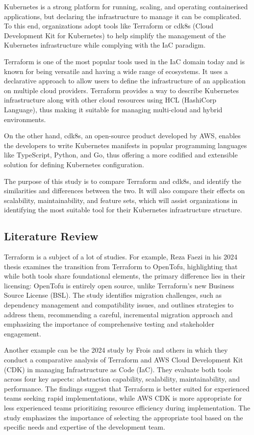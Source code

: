\documentclass{article}
\begin{document}
Kubernetes is a strong platform for running, scaling, and operating containerised applications, but declaring the infrastructure to manage it can be complicated. To this end, organizations adopt tools like Terraform or cdk8s (Cloud Development Kit for Kubernetes) to help simplify the management of the Kubernetes infrastructure while complying with the IaC paradigm.

Terraform is one of the most popular tools used in the IaC domain today and is known for being versatile and having a wide range of ecosystems. It uses a declarative approach to allow users to define the infrastructure of an application on multiple cloud providers. Terraform provides a way to describe Kubernetes infrastructure along with other cloud resources using HCL (HashiCorp Language), thus making it suitable for managing multi-cloud and hybrid environments.

On the other hand, cdk8s, an open-source product developed by AWS, enables the developers to write Kubernetes manifests in popular programming languages like TypeScript, Python, and Go, thus offering a more codified and extensible solution for defining Kubernetes configuration.

The purpose of this study is to compare Terraform and cdk8s, and identify the similarities and differences between the two. It will also compare their effects on scalability, maintainability, and feature sets, which will assist organizations in identifying the most suitable tool for their Kubernetes infrastructure structure.


\subsection{Literature Review}
\label{sec:litreview}

Terraform is a subject of a lot of studies. For example, Reza Faezi in his 2024 thesis examines the transition from Terraform to OpenTofu, highlighting that while both tools share foundational elements, the primary difference lies in their licensing: OpenTofu is entirely open source, unlike Terraform's new Business Source License (BSL). The study identifies migration challenges, such as dependency management and compatibility issues, and outlines strategies to address them, recommending a careful, incremental migration approach and emphasizing the importance of comprehensive testing and stakeholder engagement. \cite{lit-1}

Another example can be the 2024 study by Frois and others in which they conduct a comparative analysis of Terraform and AWS Cloud Development Kit (CDK) in managing Infrastructure as Code (IaC). They evaluate both tools across four key aspects: abstraction capability, scalability, maintainability, and performance. The findings suggest that Terraform is better suited for experienced teams seeking rapid implementations, while AWS CDK is more appropriate for less experienced teams prioritizing resource efficiency during implementation. The study emphasizes the importance of selecting the appropriate tool based on the specific needs and expertise of the development team. \cite{lit-2}
\end{document}

